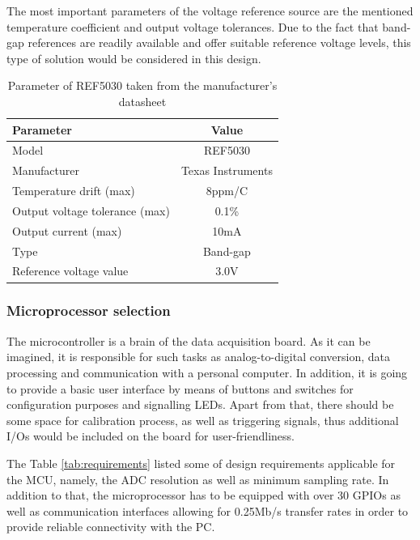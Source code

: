 \documentclass[12pt,a4paper]{article}
\begin{document}
The most important parameters of the voltage reference source are the mentioned temperature coefficient and output voltage tolerances. Due to the fact that band-gap references   are readily available and offer suitable reference voltage levels, this type of solution would be considered in this design.\par

\begin{table}[ht!]
\begin{tabular}{|l|c|}
\hline
\textbf{Parameter}	& \textbf{Value} 	\\ \hline
Model  				& REF5030       \\ \hline
Manufacturer    	& Texas Instruments	\\ \hline
Temperature drift (max)       	&  8ppm/\degree C 	\\\hline
Output voltage tolerance (max)     &  0.1\%			\\ \hline
Output current (max)       & 10mA\\ \hline
Type         &  Band-gap				\\ \hline
Reference voltage value		&  3.0V		\\ \hline

\end{tabular}
\caption{Parameter of REF5030 taken from the manufacturer's datasheet \cite{ref5030_params}}
\label{tab:fer5030_params}
\end{table}

\subsubsection{Microprocessor selection}
The microcontroller is a brain of the data acquisition board. As it can be imagined, it is responsible for such tasks as analog-to-digital conversion, data processing and communication with a personal computer. In addition, it is going to provide a basic user interface by means of buttons and switches for configuration purposes and signalling LEDs. Apart from that, there should be some space for calibration process, as well as triggering signals, thus additional I/Os would be included on the board for user-friendliness.
\par

The Table \ref{tab:requirements} listed some of design requirements applicable for the MCU, namely, the ADC resolution as well as minimum sampling rate. In addition to that, the microprocessor has to be equipped with over 30 GPIOs as well as communication interfaces allowing for 0.25Mb/s transfer rates in order to provide reliable connectivity with the PC.
\end{document}
